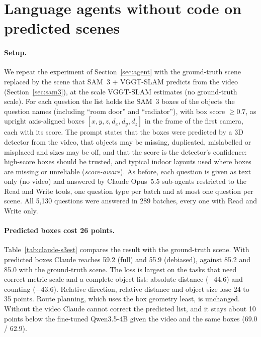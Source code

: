 
\section{Language agents without code on predicted scenes}
\label{sec:claude}

\paragraph{Setup.}
We repeat the experiment of Section~\ref{sec:agent} with the ground-truth scene replaced by the scene that
SAM~3 + VGGT-SLAM predicts from the video (Section~\ref{sec:sam3}), at the scale VGGT-SLAM estimates (no
ground-truth scale). For each question the list holds the SAM~3 boxes of the objects the question names
(including ``room door'' and ``radiator''), with box score $\geq 0.7$, as upright axis-aligned boxes
$[x, y, z, d_x, d_y, d_z]$ in the frame of the first camera, each with its score. The prompt states that the boxes
were predicted by a 3D detector from the video, that objects may be missing, duplicated, mislabelled or misplaced
and sizes may be off, and that the score is the detector's confidence: high-score boxes should be trusted, and
typical indoor layouts used where boxes are missing or unreliable (\emph{score-aware}). As before, each question is
given as text only (no video) and answered by Claude Opus~5.5 sub-agents restricted to the Read and Write tools,
one question type per batch and at most one question per scene. All 5,130 questions were answered in 289 batches,
every one with Read and Write only.

\paragraph{Predicted boxes cost 26 points.}
Table~\ref{tab:claude-s3est} compares the result with the ground-truth scene. With predicted boxes Claude reaches
59.2 (full) and 55.9 (debiased), against 85.2 and 85.0 with the ground-truth scene. The loss is largest on the tasks
that need correct metric scale and a complete object list: absolute distance ($-44.6$) and counting ($-43.6$).
Relative direction, relative distance and object size lose 24 to 35 points. Route planning, which uses the
box geometry least, is unchanged. Without the video Claude cannot correct the predicted list, and it stays
about 10 points below the fine-tuned Qwen3.5-4B given the video and the same boxes (69.0 / 62.9).

